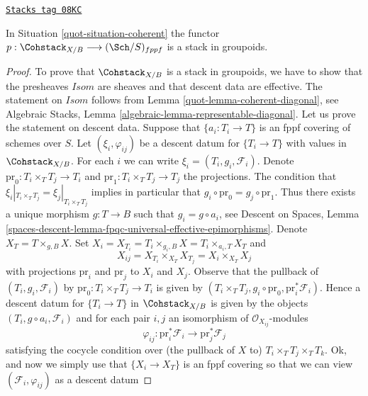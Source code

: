 \begin{lemma}
\label{quot-lemma-coherent-stack}
\href{https://stacks.math.columbia.edu/tag/08KC}{\texttt{Stacks tag 08KC}}

In Situation \ref{quot-situation-coherent} the functor
$p : \Cohstack_{X/B} \longrightarrow (\Sch/S)_{fppf}$
is a stack in groupoids.
\end{lemma}

\begin{proof}

To prove that $\Cohstack_{X/B}$ is a stack in groupoids, we have to show
that the presheaves $\mathit{Isom}$ are sheaves and that descent data are
effective. The statement on $\mathit{Isom}$ follows from
Lemma \ref{quot-lemma-coherent-diagonal}, see
Algebraic Stacks, Lemma \ref{algebraic-lemma-representable-diagonal}.
Let us prove the statement on descent data.
Suppose that $\{a_i : T_i \to T\}$ is an fppf covering of schemes over $S$.
Let $(\xi_i, \varphi_{ij})$ be a descent datum for $\{T_i \to T\}$
with values in $\Cohstack_{X/B}$.
For each $i$ we can write $\xi_i = (T_i, g_i, \mathcal{F}_i)$.
Denote $\text{pr}_0 : T_i \times_T T_j \to T_i$ and
$\text{pr}_1 : T_i \times_T T_j \to T_j$ the projections.
The condition that $\xi_i|_{T_i \times_T T_j} = \xi_j|_{T_i \times_T T_j}$
implies in particular that $g_i \circ \text{pr}_0 = g_j \circ \text{pr}_1$.
Thus there exists a unique morphism $g : T \to B$ such that
$g_i = g \circ a_i$, see
Descent on Spaces, Lemma
\ref{spaces-descent-lemma-fpqc-universal-effective-epimorphisms}.
Denote $X_T = T \times_{g, B} X$. Set
$X_i = X_{T_i} = T_i \times_{g_i, B} X = T_i \times_{a_i, T} X_T$
and
$$
X_{ij} = X_{T_i} \times_{X_T} X_{T_j} = X_i \times_{X_T} X_j
$$
with projections $\text{pr}_i$ and $\text{pr}_j$ to $X_i$ and $X_j$.
Observe that the pullback of $(T_i, g_i, \mathcal{F}_i)$
by $\text{pr}_0 : T_i \times_T T_j \to T_i$ is given by
$(T_i \times_T T_j, g_i \circ \text{pr}_0, \text{pr}_i^*\mathcal{F}_i)$.
Hence a descent datum for $\{T_i \to T\}$ in $\Cohstack_{X/B}$
is given by the objects $(T_i, g \circ a_i, \mathcal{F}_i)$
and for each pair $i, j$ an isomorphism of $\mathcal{O}_{X_{ij}}$-modules
$$
\varphi_{ij} :
\text{pr}_i^*\mathcal{F}_i \longrightarrow \text{pr}_j^*\mathcal{F}_j
$$
satisfying the cocycle condition over (the pullback of $X$ to)
$T_i \times_T T_j \times_T T_k$.
Ok, and now we simply use that $\{X_i \to X_T\}$ is an fppf covering
so that we can view $(\mathcal{F}_i, \varphi_{ij})$ as a descent datum

\end{proof}
